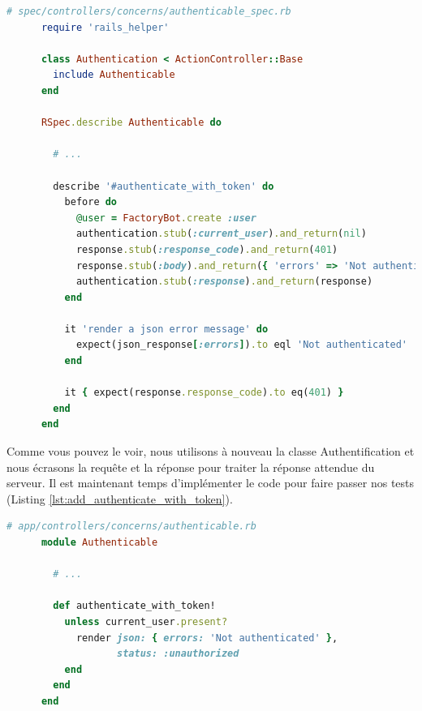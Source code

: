\documentclass[]{report}
\begin{document}
    \begin{scriptsize}
      \begin{lstlisting}[language=ruby, label={lst:add_authenticate_with_token_test}, caption={Test de l'authentification par la méthode de jeton}]
      # spec/controllers/concerns/authenticable_spec.rb
      require 'rails_helper'

      class Authentication < ActionController::Base
        include Authenticable
      end

      RSpec.describe Authenticable do

        # ...

        describe '#authenticate_with_token' do
          before do
            @user = FactoryBot.create :user
            authentication.stub(:current_user).and_return(nil)
            response.stub(:response_code).and_return(401)
            response.stub(:body).and_return({ 'errors' => 'Not authenticated' }.to_json)
            authentication.stub(:response).and_return(response)
          end

          it 'render a json error message' do
            expect(json_response[:errors]).to eql 'Not authenticated'
          end

          it { expect(response.response_code).to eq(401) }
        end
      end
      \end{lstlisting}
    \end{scriptsize}


    Comme vous pouvez le voir, nous utilisons à nouveau la classe Authentification et nous écrasons la requête et la réponse pour traiter la réponse attendue du serveur. Il est maintenant temps d'implémenter le code pour faire passer nos tests (Listing \ref{lst:add_authenticate_with_token}).

    \begin{scriptsize}
      \begin{lstlisting}[language=ruby, label={lst:add_authenticate_with_token}, caption={Ajout de l'authentification par la méthode de jeton}]
      # app/controllers/concerns/authenticable.rb
      module Authenticable

        # ...

        def authenticate_with_token!
          unless current_user.present?
            render json: { errors: 'Not authenticated' },
                   status: :unauthorized
          end
        end
      end
      \end{lstlisting}
    \end{scriptsize}
\end{document}
